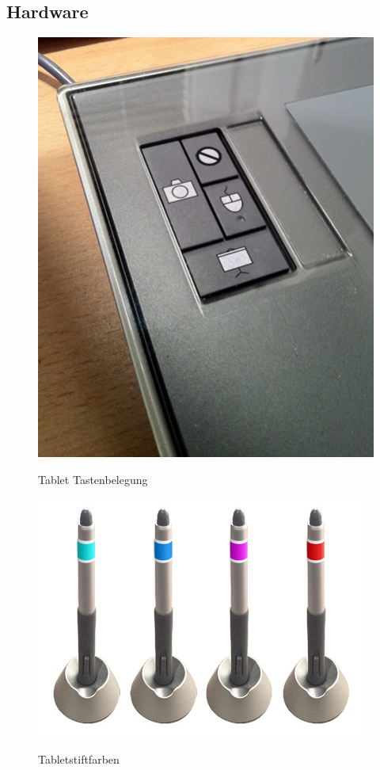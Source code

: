 \subsection{Hardware}
\begin{figure}
	\begin{center}
        {\includegraphics[width=0.8\linewidth]{gfx/scribblerTabletTasten}}
		\caption[Tablet Tastenbelegung]{Tablet Tastenbelegung}\label{fig:scribblerTabletTasten}
	\end{center}
\end{figure}
\begin{figure}
        {\includegraphics[width=1\linewidth]{gfx/scribblerColors}}
		\caption[Tabletstiftfarben]{Tabletstiftfarben}\label{fig:scribblerColors}
\end{figure}
